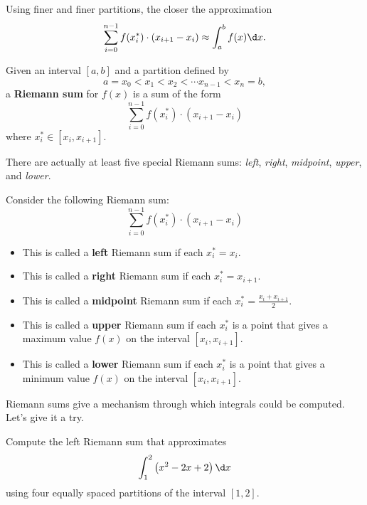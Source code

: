 \begin{marginfigure}
\caption{Using finer and finer partitions, the closer the approximation
\[
\sum_{i=0}^{n-1} f(x_i^*) \cdot (x_{i+1}-x_i) \approx \int_a^b f(x) \d x.
\]}
\label{figure:partitionsfiner}
\end{marginfigure}


\begin{definition}
Given an interval $[a,b]$ and a partition defined by
\[
a = x_0 < x_1 <x_2 < \cdots x_{n-1}< x_n = b,
\]
a \textbf{Riemann sum} for $f(x)$ is a sum of the form
\[
\sum_{i=0}^{n-1} f(x_i^*) \cdot (x_{i+1}-x_i)
\]
where $x_i^*\in [x_i,x_{i+1}]$.
\end{definition}

There are actually at least five special Riemann sums: \textit{left},
\textit{right}, \textit{midpoint}, \textit{upper}, and \textit{lower}.

\begin{definition}
Consider the following Riemann sum:
\[
\sum_{i=0}^{n-1} f(x_i^*) \cdot (x_{i+1}-x_i)
\]
\begin{itemize}
\item This is called a \textbf{left} Riemann sum if each $x_i^* =
  x_i$.
\item This is called a \textbf{right} Riemann sum if each $x_i^* =
  x_{i+1}$.
\item This is called a \textbf{midpoint} Riemann sum if each $x_i^*
  = \frac{x_i+x_{i+1}}{2}$.
\item This is called a \textbf{upper} Riemann sum if each $x_i^*$ is
  a point that gives a maximum value $f(x)$ on the interval
  $[x_i,x_{i+1}]$.
\item This is called a \textbf{lower} Riemann sum if each $x_i^*$ is a
  point that gives a minimum value $f(x)$ on the interval
  $[x_i,x_{i+1}]$.
\end{itemize}
\end{definition}
Riemann sums give a mechanism through which integrals could be
computed. Let's give it a try.

\begin{example}
Compute the left Riemann sum that approximates
\[
\int_1^2 \left(x^2-2x+2\right)\d x
\]
using four equally spaced partitions of the interval $[1,2]$.
\end{example}

